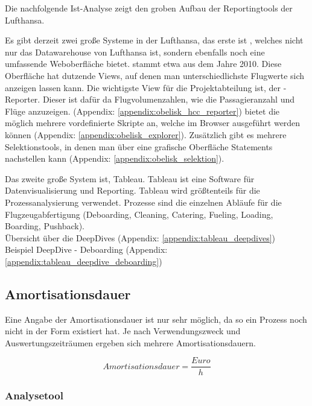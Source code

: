 		{

			\noindent
			Die nachfolgende Ist-Analyse zeigt den groben Aufbau der Reportingtools der Lufthansa.
		}
		{
			 \noindent
			 Es gibt derzeit zwei große Systeme in der Lufthansa, das erste ist , welches nicht nur das Datawarehouse von Lufthansa ist, sondern ebenfalls noch eine umfassende Weboberfläche bietet.  stammt etwa aus dem Jahre 2010.
			Diese Oberfläche hat dutzende Views, auf denen man unterschiedlichste Flugwerte sich anzeigen lassen kann. Die wichtigste View für die Projektabteilung ist, der -Reporter. Dieser ist dafür da Flugvolumenzahlen, wie die Passagieranzahl und Flüge anzuzeigen.
			(Appendix: \ref{appendix:obelisk_hcc_reporter})
			 bietet die möglich mehrere vordefinierte  Skripte an, welche im Browser ausgeführt werden können (Appendix: \ref{appendix:obelisk_explorer}).
			Zusätzlich gibt es mehrere Selektionstools, in denen man über eine grafische Oberfläche  Statements nachstellen kann (Appendix: \ref{appendix:obelisk_selektion}).
		}

		{
			\noindent
			Das zweite große System ist, Tableau. Tableau ist eine Software für Datenvisualisierung und Reporting. Tableau wird größtenteils für die Prozessanalysierung verwendet. Prozesse sind die einzelnen Abläufe für die Flugzeugabfertigung (Deboarding, Cleaning, Catering, Fueling, Loading, Boarding, Pushback).\\

		}
		{
			\noindent
			Übersicht über die DeepDives (Appendix: \ref{appendix:tableau_deepdives})\\
			Beispiel DeepDive - Deboarding (Appendix: \ref{appendix:tableau_deepdive_deboarding})
		}

	\subsection{Amortisationsdauer}

	{
		\noindent
		Eine Angabe der Amortisationsdauer ist nur sehr möglich, da so ein Prozess noch nicht in der Form existiert hat. Je nach Verwendungszweck und Auswertungszeiträumen ergeben sich mehrere Amortisationsdauern.

		\[ Amortisationsdauer = \frac{Euro}{h} \]

	}
	
	\subsubsection{Analysetool}

